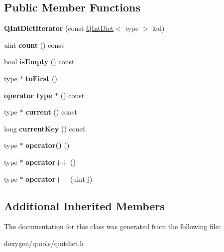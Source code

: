 \subsection*{Public Member Functions}
\begin{DoxyCompactItemize}
\item 
\mbox{\label{class_q_int_dict_iterator_a86a4f264c764e480f05fdcc3a5d0ab48}} 
{\bfseries Q\+Int\+Dict\+Iterator} (const \mbox{\hyperlink{class_q_int_dict}{Q\+Int\+Dict}}$<$ type $>$ \&d)
\item 
\mbox{\label{class_q_int_dict_iterator_a832782b5f4d0ce4aa74ab1a88812f3c8}} 
uint {\bfseries count} () const
\item 
\mbox{\label{class_q_int_dict_iterator_a5928131e0b5df6174f97dc3b9dc75950}} 
bool {\bfseries is\+Empty} () const
\item 
\mbox{\label{class_q_int_dict_iterator_a33b6a043078a96bc09ade5c2b34fe4a5}} 
type $\ast$ {\bfseries to\+First} ()
\item 
\mbox{\label{class_q_int_dict_iterator_a07ea27c2bade58d6fde52206e824101b}} 
{\bfseries operator type $\ast$} () const
\item 
\mbox{\label{class_q_int_dict_iterator_ae19b296c0d60e2225b0827037db1c126}} 
type $\ast$ {\bfseries current} () const
\item 
\mbox{\label{class_q_int_dict_iterator_a0da86c6b5b34f9324a0adfd3b1de2ec7}} 
long {\bfseries current\+Key} () const
\item 
\mbox{\label{class_q_int_dict_iterator_a5e6a7783d95670524c5e0f1b7a264845}} 
type $\ast$ {\bfseries operator()} ()
\item 
\mbox{\label{class_q_int_dict_iterator_a1225f5d0427763966d1f5525c7d6a38a}} 
type $\ast$ {\bfseries operator++} ()
\item 
\mbox{\label{class_q_int_dict_iterator_afc1f2790370fc483def77c3434a03978}} 
type $\ast$ {\bfseries operator+=} (uint j)
\end{DoxyCompactItemize}
\subsection*{Additional Inherited Members}


The documentation for this class was generated from the following file\+:\begin{DoxyCompactItemize}
\item 
doxygen/qtools/qintdict.\+h\end{DoxyCompactItemize}
